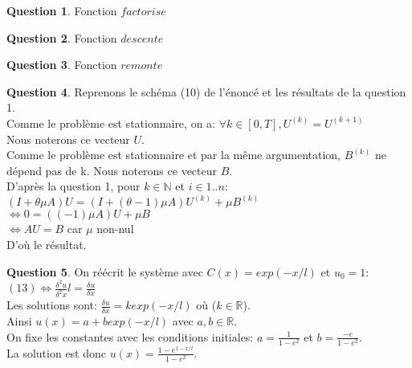 \documentclass[a4paper]{article}
\theoremstyle{definition}
\newtheorem{que}{Question}
\begin{document}
	\begin{que}
		Fonction $factorise$
	\end{que}
	\begin{que}
		Fonction $descente$
	\end{que}
	\begin{que}
		Fonction $remonte$
	\end{que}
	\begin{que}
		Reprenons le schéma (10) de l'énoncé et les résultats de la question 1. \\

		Comme le problème est stationnaire, on a: $\forall k \in [0, T],  U^{(k)}=U^{(k+1)}$ \\
		Nous noterons ce vecteur $U$. \\

		Comme le problème est stationnaire et par la même argumentation, $B^{(k)}$ ne dépend pas de k. Nous noterons ce vecteur $B$. \\

		D'après la question 1, pour $k \in \mathbb{N}$ et $i \in 1..n$: \\
		$(I + \theta \mu A)U = (I + (\theta - 1) \mu A)U^{(k)} + \mu B^{(k)}$ \\
		$\Leftrightarrow 0 = (( - 1) \mu A)U + \mu B$ \\
		$\Leftrightarrow AU = B$ car $\mu$ non-nul \\
		D'où le résultat. \\
	\end{que}
	\begin{que}
		On réécrit le système avec $C(x)=exp(-x/l)$ et $u_0 = 1$: \\
		$(13) \Leftrightarrow \frac{\delta^2 u}{\delta^2 x} l = \frac{\delta u }{\delta x}$ \\
		Les solutions sont: $ \frac{\delta u }{\delta x} = k exp(-x/l)$ où ($k \in \mathbb{R}$). \\
		Ainsi $u(x) = a + b exp(-x/l)$ avec $a, b \in \mathbb{R}$. \\
		On fixe les constantes avec les conditions initiales: $a=\frac{1}{1-e^2}$ et $b=\frac{-e}{1-e^2}$. \\
		La solution est donc $u(x)=\frac{1 - e^{1-x/l}}{1-e^2}$. \\
	\end{que}
\end{document}
